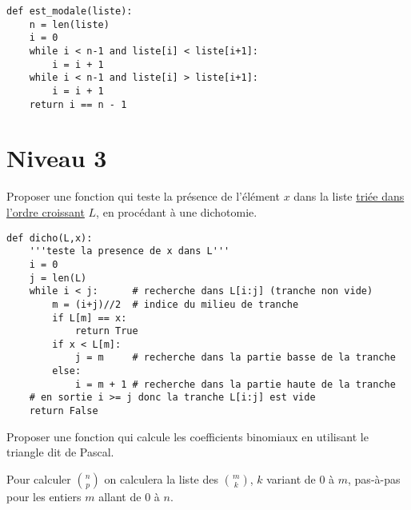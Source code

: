 \begin{Answer}
\begin{lstlisting}
def est_modale(liste):
    n = len(liste)
    i = 0
    while i < n-1 and liste[i] < liste[i+1]:
        i = i + 1
    while i < n-1 and liste[i] > liste[i+1]:
        i = i + 1
    return i == n - 1
\end{lstlisting}
\end{Answer} 
\section{Niveau 3}
\begin{Exercise}
Proposer une fonction  qui teste la présence de l'élément $x$ dans la liste \underline{triée dans l'ordre croissant} $L$, en procédant à  une dichotomie.
\end{Exercise}
\begin{Answer}
\begin{lstlisting}
def dicho(L,x):
    '''teste la presence de x dans L'''
    i = 0
    j = len(L)    
    while i < j:      # recherche dans L[i:j] (tranche non vide)
        m = (i+j)//2  # indice du milieu de tranche
        if L[m] == x:
            return True
        if x < L[m]:
            j = m     # recherche dans la partie basse de la tranche
        else:
            i = m + 1 # recherche dans la partie haute de la tranche
    # en sortie i >= j donc la tranche L[i:j] est vide
    return False
\end{lstlisting}
\end{Answer}
\begin{Exercise}
Proposer une fonction qui calcule les coefficients binomiaux en utilisant le triangle dit de Pascal. 

Pour calculer $\binom n p$ on calculera la liste des $\binom m k$, $k$ variant de 0 à $m$,  pas-à-pas pour les entiers  $m$ allant de 0 à $n$. 
\end{Exercise}

